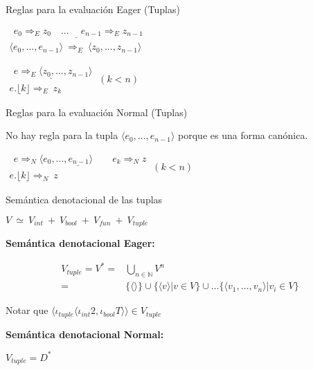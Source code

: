 \documentclass[handout]{beamer}
\begin{document}
\begin{frame}{Reglas para la evaluación Eager (Tuplas)}

\bigskip



$\begin{array}{c}
\underline{\ \ e_0 \Rightarrow_E z_0\quad ... \quad \ e_{n-1} \Rightarrow_E z_{n-1} }\\
\langle e_0,...,e_{n-1}\rangle\ \Rightarrow_E\ \langle z_0,...,z_{n-1}\rangle
\end{array}
$

\pause
\bigskip

\bigskip

$\begin{array}{c}
\underline{\ \ e \Rightarrow_E \langle z_0,...,z_{n-1}\rangle }\\
 e.\lfloor k\rfloor \Rightarrow_E\ z_k
\end{array}
\ (k<n)$

\end{frame}


\begin{frame}{Reglas para la evaluación Normal (Tuplas)}

\bigskip

No hay regla para la tupla $\langle e_0,...,e_{n-1}\rangle $ porque es una forma canónica. 

\bigskip

\bigskip
\pause
$\begin{array}{c}
\underline{\ \ e \Rightarrow_N \langle e_0,...,e_{n-1}\rangle\qquad e_k \Rightarrow_N z }\\
 e.\lfloor k\rfloor \Rightarrow_N\ z
\end{array}
\ (k<n)$

\end{frame}



\begin{frame}{Semántica denotacional de las tuplas}

$V\ \simeq\ V_{int}\ +\ V_{bool}\ +\ V_{fun}\ +\ V_{tuple}$

\pause
\bigskip

\textbf{Semántica denotacional Eager:}

\begin{align*}
V_{tuple}= V^* = &\bigcup_{n \in \mathbb{N}} V^n  \\
    =  & \{ \langle \rangle \} \cup \{ \langle v \rangle | v \in V\} \cup \ldots \{ \langle v_1, \ldots, v_n \rangle | v_i \in V\}
\end{align*}

Notar que $\langle \iota_{\mathit{tuple}}\langle \iota_{int} 2 , \iota_{bool}T \rangle \rangle\in V_{tuple}$
\pause
\bigskip

\textbf{Semántica denotacional Normal:}

\medskip

$V_{tuple}= D^*$

\end{frame}
\end{document}
